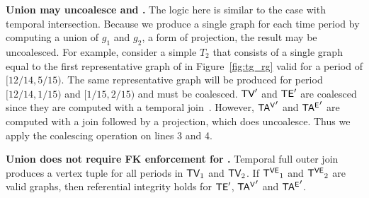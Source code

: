
{\bf Union may uncoalesce \tve and \trg.}  The logic here is similar
to the case with temporal intersection.  Because we produce a single
graph for each time period by computing a union of $g_1$ and $g_2$, a
form of projection, the result may be uncoalesced.  For example,
consider a simple \tg $T_2$ that consists of a single graph equal to
the first representative graph of  in Figure~\ref{fig:tg_rg}
valid for a period of $[12/14, 5/15)$.  The same representative graph
  will be produced for period $[12/14, 1/15)$ and $[1/15, 2/15)$ and
      must be coalesced.  $\textsf{TV}'$ and $\textsf{TE}'$ are coalesced since they
      are computed with a temporal
      join~\cite{DBLP:conf/vldb/BohlenSS96}.  However, $\mathsf{TA^{V}}'$ and
      $\mathsf{TA^{E}}'$ are computed with a join followed by a projection, which
      does uncoalesce.  Thus we apply the coalescing operation on
      lines 3 and 4.

{\bf Union does not require FK enforcement for \tve.} Temporal full
outer join produces a vertex tuple for all periods in $\textsf{TV}_1$ and
$\textsf{TV}_2$.  If $\mathsf{T^{VE}}_1$ and $\mathsf{T^{VE}}_2$ are valid graphs, then 
referential integrity holds for $\textsf{TE}'$, $\mathsf{TA^{V}}'$ and $\mathsf{TA^{E}}'$.


